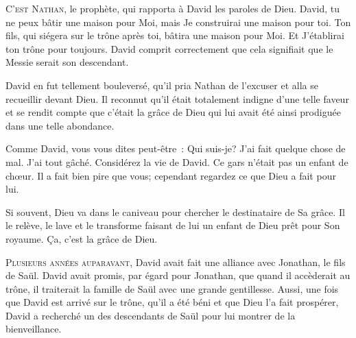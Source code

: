 \lettrine{C}{'est Nathan,} le prophète, qui rapporta à David
 les paroles de Dieu.
 \og David, tu ne peux bâtir une maison pour Moi, mais Je construirai
 une maison pour toi.
 Ton fils, qui siégera sur le trône après toi, bâtira une maison pour Moi.
 Et J'établirai ton trône pour toujours. \fg{}
 David comprit correctement que cela signifiait
 que le Messie serait son descendant. 

David en fut tellement bouleversé, qu'il pria Nathan de l'excuser
 et alla se recueillir devant Dieu.
 Il reconnut qu'il était totalement indigne d'une telle faveur
 et se rendit compte que c'était la grâce de Dieu qui lui avait été ainsi
 prodiguée dans une telle abondance. 

Comme David, vous vous dites peut-être~:
 \og Qui suis-je? J'ai fait quelque chose de mal. J'ai tout gâché. \fg{}
 Considérez la vie de David. Ce gars n'était pas un enfant de ch\oe{}ur.
 Il a fait bien pire que vous; cependant regardez ce que Dieu a fait pour lui.


Si souvent, Dieu va dans le caniveau pour chercher le destinataire de Sa grâce.
 Il le relève, le lave et le transforme \ocadr faisant de lui un enfant de Dieu
 prêt pour Son royaume. Ça, c'est la grâce de Dieu. 

\dvrule






\lettrine{P}{lusieurs années auparavant,} David avait fait
 une alliance avec Jonathan, le fils de Saül.
 David avait promis, par égard pour Jonathan,
 que quand il accèderait au trône, il traiterait la famille de Saül
 avec une grande gentillesse.
 Aussi, une fois que David est arrivé sur le trône,
 qu'il a été béni et que Dieu l'a fait prospérer,
 David a recherché un des descendants de Saül
 pour lui montrer de la bienveillance. 

